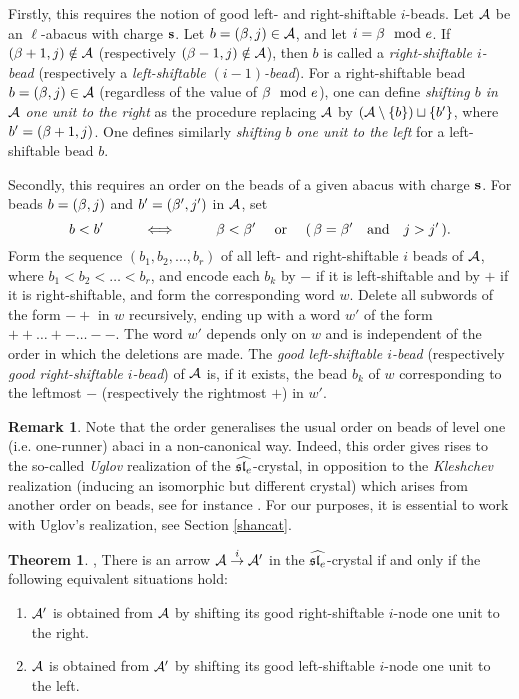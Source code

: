\documentclass[12pt]{amsart}
\numberwithin{equation}{section}
\theoremstyle{definition}
\newtheorem{theorem}[equation]{Theorem}
\newtheorem{remark}[equation]{Remark}
\begin{document}
Firstly, this requires the notion of good left- and right-shiftable $i$-beads. 
Let $\mathcal{A}$ be an $\ell$-abacus with charge $\mathbf{s}$.
Let $b=(\beta,j)\in\mathcal{A}$, and let $i=\beta\mod e$.
If $(\beta+1,j)\notin\mathcal{A}$ (respectively $(\beta-1,j)\notin\mathcal{A}$), then $b$ is called a \textit{right-shiftable $i$-bead} 
(respectively a \textit{left-shiftable $(i-1)$-bead}).
For a right-shiftable bead $b=(\beta,j)\in\mathcal{A}$ (regardless of the value of $\beta\mod e$), one can define
\textit{shifting $b$ in $\mathcal{A}$ one unit to the right} as the procedure replacing $\mathcal{A}$ by $(\mathcal{A}\setminus \{ b \}) \sqcup \{ b' \}$, where $b'=(\beta+1,j)$.
One defines similarly \textit{shifting $b$ one unit to the left} for a left-shiftable bead $b$.

Secondly, this requires an order on the beads of a given abacus with charge $\mathbf{s}$.
For beads $b=(\beta,j)$ and $b'=(\beta',j')$ in $\mathcal{A}$, set 
$$
b<b' 
\hspace{1cm}
\Longleftrightarrow
\hspace{1cm}
\beta<\beta' 
\text{ \quad or \quad } 
(\, \beta=\beta' \quad\text{and}\quad j>j' \,).
$$
Form the sequence $(b_1,b_2,\dots, b_r)$ of all left- and right-shiftable $i$ beads of $\mathcal{A}$, where $b_1<b_2<\dots<b_r$, and
encode each $b_k$ by $-$ if it is left-shiftable and by $+$ if it is right-shiftable, and form the corresponding word $w$.
Delete all subwords of the form $-+$ in $w$ recursively, ending up with 
a word $w'$ of the form $++\dots+-\dots--$. The word $w'$ depends only on $w$ and is independent of the order in which the deletions are made.
The \textit{good left-shiftable $i$-bead} (respectively \textit{good right-shiftable $i$-bead}) of $\mathcal{A}$ is, if it exists, 
the bead $b_k$ of $w$ corresponding to the leftmost $-$ (respectively the rightmost $+$) in $w'$.

\begin{remark}\label{remUglovvsKleshchev}
Note that the order generalises the usual order on beads of level one (i.e. one-runner) abaci in a non-canonical way. 
Indeed, this order gives rises to the so-called \textit{Uglov} realization of the $\widehat{\mathfrak{sl}_e}$-crystal,
in opposition to the \textit{Kleshchev} realization (inducing an isomorphic but different crystal) which arises from another order on beads,
see for instance \cite[Example 6.2.16]{GeckJacon2011}.
For our purposes, it is essential to work with Uglov's realization, see Section \ref{shancat}.
\end{remark}



\begin{theorem}\cite[Section 3]{JMMO1991}, \cite[Theorem 2.8]{FLOTW1999}\label{thmchapeaucrystal}
There is an arrow $\mathcal{A}\overset{i}{\rightarrow}\mathcal{A}'$ in the $\widehat{\mathfrak{sl}_e}$-crystal 
if and only if the following equivalent situations hold:
\begin{enumerate}
 \item $\mathcal{A}'$ is obtained from $\mathcal{A}$ by shifting its
good right-shiftable $i$-node one unit to the right.
\item $\mathcal{A}$ is obtained from $\mathcal{A}'$ by shifting its
good left-shiftable $i$-node one unit to the left.
\end{enumerate}
\end{theorem}
\end{document}
